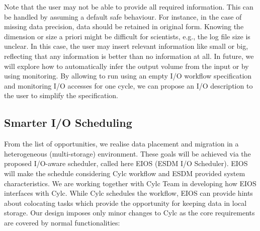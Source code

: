 \documentclass{superfri}
\begin{document}
Note that the user may not be able to provide all required information.
This can be handled by assuming a default safe behaviour.
For instance, in the case of missing data precision, data should be retained in original form.
Knowing the dimension or size a priori might be difficult for scientists, e.g., the log file size is unclear.
In this case, the user may insert relevant information like small or big, reflecting that any information is better than no information at all.
In future, we will explore how to automatically infer the output volume from the input or by using monitoring.
By allowing to run using an empty I/O workflow specification and monitoring I/O accesses for one cycle, we can propose an I/O description to the user to simplify the specification.

\subsection{Smarter I/O Scheduling}

From the list of opportunities, we realise data placement and migration in a heterogeneous (multi-storage) environment.
These goals will be achieved via the proposed I/O-aware scheduler, called here EIOS (ESDM I/O Scheduler).
EIOS will make the schedule considering Cylc workflow and ESDM provided system characteristics.
We are working together with Cylc Team in developing how EIOS interfaces with Cylc.
While Cylc schedules the workflow, EIOS can provide hints about colocating tasks which provide the opportunity for keeping data in local storage.
Our design imposes only minor changes to Cylc as the core requirements are covered by normal functionalities:
\end{document}
